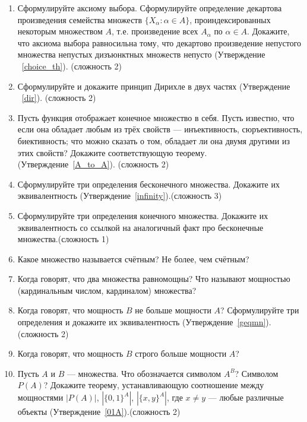 \documentclass[12pt,oneside]{article}
\theoremstyle{definition}
\begin{document}
\begin{enumerate}
\item Сформулируйте аксиому выбора. Сформулируйте определение декартова произведения семейства множеств $\{X_\alpha: \alpha\in A\}$, проиндексированных некоторым множеством $A$, т.е. произведение всех $A_\alpha$ по $\alpha\in A$.  Докажите, что аксиома выбора равносильна тому, что декартово произведение непустого множества непустых дизъюнктных множеств непусто (Утверждение ~\ref{choice_th}). (сложность 2)

\item Сформулируйте и докажите принцип Дирихле в двух частях (Утверждение ~\ref{dir}). (сложность 2)

\item Пусть функция отображает конечное множество в себя. Пусть известно, что если она обладает любым из трёх свойств --- инъективность, сюръективность, биективность; что можно сказать о том, обладает ли она двумя другими из этих свойств? Докажите соответствующую теорему. (Утверждение~\ref{A_to_A}). (сложность 2) 

\item  Сформулируйте три определения бесконечного множества. Докажите их эквивалентность (Утверждение~\ref{infinity}).(сложность 3)

\item  Сформулируйте три определения конечного множества. Докажите их эквивалентность со ссылкой на аналогичный факт про бесконечные множества.(сложность 1)

\item  Какое множество называется счётным? Не более, чем счётным?

\item  Когда говорят, что два множества равномощны? Что называют мощностью (кардинальным числом, кардиналом) множества?

\item  Когда говорят, что мощность $B$ не больше мощности $A$? Сформулируйте три определения и докажите их эквивалентность (Утверждение~\ref{geqmn}).(сложность 2)

\item  Когда говорят, что мощность $B$ строго больше мощности $A$? 

\item  Пусть $A$ и $B$ --- множества. Что обозначается символом $A^B$? Символом $P(A)$? Докажите теорему, устанавливающую соотношение между мощностями $|P(A)|$, $|\{0,1\}^A|$, $|\{x,y\}^A|$, где $x\neq y$ --- любые различные объекты (Утверждение~\ref{01A}).(сложность 2)


\end{enumerate}
\end{document}
